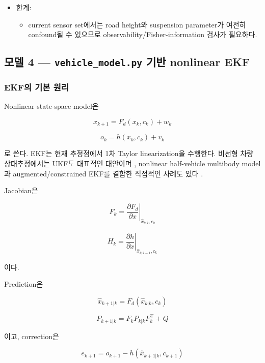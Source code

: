 \documentclass[letterpaper,10pt,journal,twocolumn]{ieeeconf}
\begin{document}
\begin{itemize}
  \begin{itemize}
  
  \item
    모델 2와 달리 bounce와 pitch를 동시에 표현한다.
  \item
    front--rear delay가 bump의 식별성을 높인다.
  \end{itemize}
\item
  한계:

  \begin{itemize}
  
  \item
    current sensor set에서는 road height와 suspension parameter가 여전히 confound될 수 있으므로 observability/Fisher-information 검사가 필요하다.
  \end{itemize}
\end{itemize}

\subsection{모델 4 --- \texttt{vehicle\_model.py} 기반 nonlinear EKF}

\subsubsection{EKF의 기본 원리}

Nonlinear state-space model은

\[
x_{k+1}
=
F_d(x_k,c_k)+w_k
\]

\[
o_k=h(x_k,c_k)+v_k
\]

로 쓴다. EKF는 현재 추정점에서 1차 Taylor linearization을 수행한다. 비선형 차량 상태추정에서는 UKF도 대표적인 대안이며 \cite{antonov2011}, nonlinear half-vehicle multibody model과 augmented/constrained EKF를 결합한 직접적인 사례도 있다 \cite{debarbouille2022}.

Jacobian은

\[
F_k
=
\left.
\frac{\partial F_d}{\partial x}
\right|_{\hat x_{k|k},c_k}
\]

\[
H_k
=
\left.
\frac{\partial h}{\partial x}
\right|_{\hat x_{k|k-1},c_k}
\]

이다.

Prediction은

\[
\hat x_{k+1|k}
=
F_d(\hat x_{k|k},c_k)
\]

\[
P_{k+1|k}
=
F_kP_{k|k}F_k^\top+Q
\]

이고, correction은

\[
e_{k+1}
=
o_{k+1}-h(\hat x_{k+1|k},c_{k+1})
\]
\end{document}

